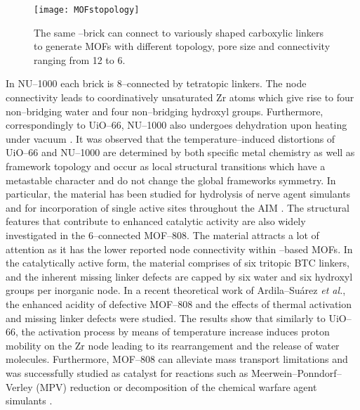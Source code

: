 \begin{figure}[!h]
	\centering
	\texttt{[image: MOFstopology]}
	\caption{The same --brick can connect to variously shaped carboxylic
	linkers to generate MOFs with different topology, pore size and connectivity
	ranging from 12 to 6.}
	\label{fig:MOFstopology}
\end{figure}
\npar
\newpage
In NU--1000 each brick is 8--connected by tetratopic linkers. The node
connectivity leads to coordinatively unsaturated Zr atoms which give rise to four non--bridging water and four non--bridging hydroxyl
groups.
Furthermore, correspondingly to UiO--66, NU--1000 also undergoes dehydration
upon heating under vacuum \cite{Platero-Prat2016}. It was observed that the
temperature--induced distortions of UiO--66 and NU--1000 are determined by both
specific metal chemistry as well as framework topology and occur as local structural
transitions which have a metastable character and do not change the global frameworks symmetry.
In particular, the material has been studied for hydrolysis of nerve agent simulants and for incorporation of single active sites throughout the
AIM \cite{Yang2015, Rimoldi2017, Ortuno2016, Mondloch2015, Kim2018, Kim2015,
Deria2014, Asha2017}.
\npar
The structural features that contribute to enhanced catalytic activity are also
widely investigated in the 6--connected MOF--808. The material
attracts a lot of attention as it has the lower reported node connectivity
within --based MOFs. In the catalytically active form, the material comprises of six tritopic
BTC linkers, and the inherent missing linker defects are capped by six water and six hydroxyl groups per inorganic node. In a
recent theoretical work of Ardila--Su\'arez \textit{et al.}\cite{Ardila-Suarez2018}, the enhanced acidity of defective MOF--808 and the
effects of thermal activation and missing linker defects were studied. The
results show that similarly to UiO--66, the activation process by means of temperature increase induces proton mobility on the
Zr node leading to its rearrangement and the release of water molecules.
Furthermore, MOF--808 can alleviate mass transport limitations and was
successfully studied as catalyst for reactions such as
Meerwein--Ponndorf--Verley (MPV) reduction or decomposition of the chemical warfare
agent simulants \cite{Plessers2016, Plonka2017, deKoning2017}.


